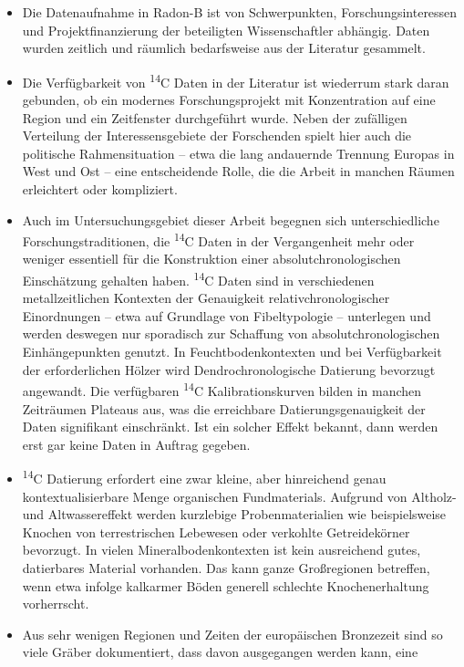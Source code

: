 \documentclass[openany,twoside,twocolumn]{book}
\providecommand{\tightlist}{%
  \setlength{\itemsep}{0pt}\setlength{\parskip}{0pt}}
\begin{document}
\begin{itemize}
\tightlist
\item
  Die Datenaufnahme in Radon-B ist von Schwerpunkten,
  Forschungsinteressen und Projektfinanzierung der beteiligten
  Wissenschaftler abhängig. Daten wurden zeitlich und räumlich
  bedarfsweise aus der Literatur gesammelt.
\item
  Die Verfügbarkeit von \textsuperscript{14}C Daten in der Literatur ist
  wiederrum stark daran gebunden, ob ein modernes Forschungsprojekt mit
  Konzentration auf eine Region und ein Zeitfenster durchgeführt wurde.
  Neben der zufälligen Verteilung der Interessensgebiete der Forschenden
  spielt hier auch die politische Rahmensituation -- etwa die lang
  andauernde Trennung Europas in West und Ost -- eine entscheidende
  Rolle, die die Arbeit in manchen Räumen erleichtert oder kompliziert.
\item
  Auch im Untersuchungsgebiet dieser Arbeit begegnen sich
  unterschiedliche Forschungstraditionen, die \textsuperscript{14}C
  Daten in der Vergangenheit mehr oder weniger essentiell für die
  Konstruktion einer absolutchronologischen Einschätzung gehalten haben.
  \textsuperscript{14}C Daten sind in verschiedenen metallzeitlichen
  Kontexten der Genauigkeit relativchronologischer Einordnungen -- etwa
  auf Grundlage von Fibeltypologie -- unterlegen und werden deswegen nur
  sporadisch zur Schaffung von absolutchronologischen Einhängepunkten
  genutzt. In Feuchtbodenkontexten und bei Verfügbarkeit der
  erforderlichen Hölzer wird Dendrochronologische Datierung bevorzugt
  angewandt. Die verfügbaren \textsuperscript{14}C Kalibrationskurven
  bilden in manchen Zeiträumen Plateaus aus, was die erreichbare
  Datierungsgenauigkeit der Daten signifikant einschränkt. Ist ein
  solcher Effekt bekannt, dann werden erst gar keine Daten in Auftrag
  gegeben.
\item
  \textsuperscript{14}C Datierung erfordert eine zwar kleine, aber
  hinreichend genau kontextualisierbare Menge organischen Fundmaterials.
  Aufgrund von Altholz- und Altwassereffekt werden kurzlebige
  Probenmaterialien wie beispielsweise Knochen von terrestrischen
  Lebewesen oder verkohlte Getreidekörner bevorzugt. In vielen
  Mineralbodenkontexten ist kein ausreichend gutes, datierbares Material
  vorhanden. Das kann ganze Großregionen betreffen, wenn etwa infolge
  kalkarmer Böden generell schlechte Knochenerhaltung vorherrscht.
\item
  Aus sehr wenigen Regionen und Zeiten der europäischen Bronzezeit sind
  so viele Gräber dokumentiert, dass davon ausgegangen werden kann, eine

\end{itemize}
\end{document}
